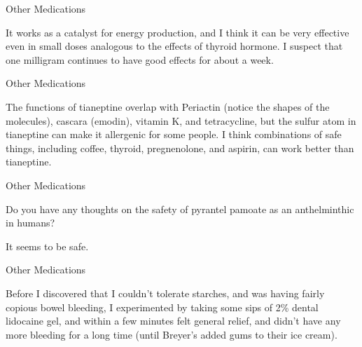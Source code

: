 \documentclass[11pt,oneside,openany,extrafontsizes]{memoir}
\begin{document}
\begin{standalonequote}{Other Medications}

    \begin{answer}
      It works as a catalyst for energy production, and I think it can be very effective even in small doses analogous to the effects of thyroid hormone. I suspect that one milligram continues to have good effects for about a week.
    \end{answer}
\end{standalonequote}

\begin{standalonequote}{Other Medications}

    \begin{answer}
      The functions of tianeptine overlap with Periactin (notice the shapes of the molecules), cascara (emodin), vitamin K, and tetracycline, but the sulfur atom in tianeptine can make it allergenic for some people. I think combinations of safe things, including coffee, thyroid, pregnenolone, and aspirin, can work better than tianeptine.
    \end{answer}
\end{standalonequote}

\begin{qaexchange}{Other Medications}

    \begin{question}
        Do you have any thoughts on the safety of pyrantel pamoate as an anthelminthic in humans?
    \end{question}

    \begin{answer}
      It seems to be safe.
    \end{answer}
\end{qaexchange}

\begin{standalonequote}{Other Medications}

    \begin{answer}
      Before I discovered that I couldn't tolerate starches, and was having fairly copious bowel bleeding, I experimented by taking some sips of 2\% dental lidocaine gel, and within a few minutes felt general relief, and didn't have any more bleeding for a long time (until Breyer's added gums to their ice cream).
    \end{answer}
\end{standalonequote}
\end{document}
